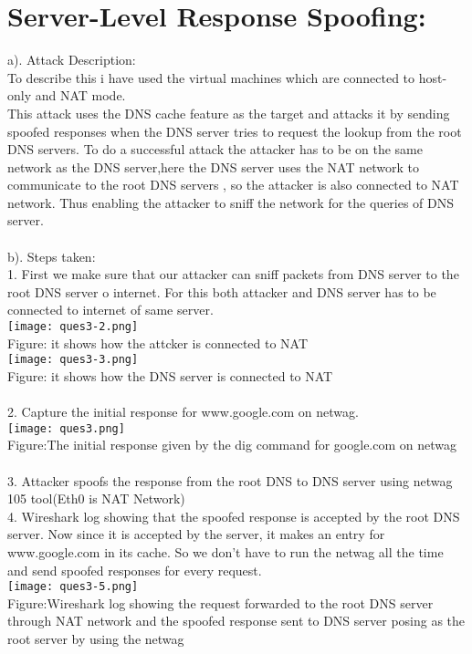 \documentclass{article}
\begin{document}
\section{Server-Level Response Spoofing:}
a). Attack Description:
\\
To describe this i  have used the virtual machines which  are connected to host-only and NAT mode.
\\This attack uses the DNS cache feature as the target and attacks it by sending spoofed responses when the DNS server tries to request the lookup from the root DNS servers. To do a successful attack the attacker has to be on the same network as the DNS server,here the DNS server uses the NAT network to communicate to the root DNS servers , so the attacker is also connected to NAT network. Thus enabling the attacker to sniff the network for the queries of DNS server.
\\
\\
b). Steps taken:
\\
1. First we make sure that  our attacker can sniff packets from DNS server to the root DNS server o internet.
For this both attacker and DNS server has to be connected to internet of same server.\\
\texttt{[image: ques3-2.png]}
\\Figure: it shows how the attcker is connected to NAT
 \\
\texttt{[image: ques3-3.png]}
\\Figure: it shows how the DNS server is connected to NAT
 \\ \\
2. Capture the initial response for www.google.com on netwag.
\\
\texttt{[image: ques3.png]}
\\Figure:The initial response given by the dig command for google.com on netwag
 \\ \\
3. Attacker spoofs the response from the root DNS to DNS server using netwag 105 tool(Eth0 is
NAT Network)\\
4. Wireshark log showing that the spoofed response is accepted by the root DNS server. Now since it is accepted by the server, it makes an entry for www.google.com in its cache. So we don’t have to run the netwag all the time and send spoofed responses for every request.
\\
\texttt{[image: ques3-5.png]}
\\Figure:Wireshark log showing the request forwarded to the root DNS server through NAT network and the spoofed response sent to DNS server posing as the root server by using the netwag
 \\ \\
\end{document}
